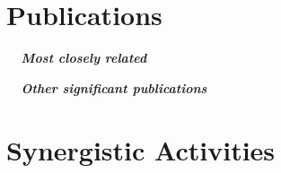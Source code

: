 \section{Publications}

\vspace{2mm}
\noindent \textbf{\textit{\ \ Most closely related}}
\begin{bibunit}
\nocite{apsrev42Control}
\nocite{PirieNatPhys2020,MattPRB2020,WebbPRX2019,GozarNanoLett2017,HuangPRL2015}
\putbib[publications]
\end{bibunit}

\vspace{2mm}
\noindent \textbf{\textit{\ \ Other significant publications}}
\begin{bibunit}
\nocite{apsrev42Control}
\nocite{CominScience2014,ZeljkovicNanoLetters2014,SoumyanarayananPNAS2013,ZeljkovicScience2012,HoffmanScience2002qpi}
\putbib[publications]
\end{bibunit}

\section{Synergistic Activities}


